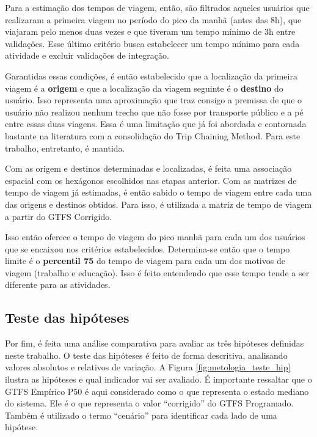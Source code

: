 \documentclass[        
    a4paper,          %
    12pt,             %
    chapter=TITLE,    %
    section=Title,    %
    subsection=Title, %
    oneside,          %
    english,          %
    spanish,          %
    brazil,           %
    fleqn             %
]{abntex2}
\begin{document}
  Para a estimação dos tempos de viagem, então, são filtrados aqueles usuários que realizaram a primeira viagem no período do pico da manhã (antes das 8h), que viajaram pelo menos duas vezes e que tiveram um tempo mínimo de 3h entre validações. Esse último critério busca estabelecer um tempo mínimo para cada atividade e excluir validações de integração.
  
  Garantidas essas condições, é então estabelecido que a localização da primeira viagem é a \textbf{origem} e que a localização da viagem seguinte é o \textbf{destino} do usuário. Isso representa uma aproximação que traz consigo a premissa de que o usuário não realizou nenhum trecho que não fosse por transporte público e a pé entre essas duas viagens. Essa é uma limitação que já foi abordada e contornada bastante na literatura \citep{Trepanier2007, Munizaga2012} com a consolidação do Trip Chaining Method. Para este trabalho, entretanto, é mantida.
  
  Com as origem e destinos determinadas e localizadas, é feita uma associação espacial com os hexágonos escolhidos nas etapas anterior. Com as matrizes de tempo de viagem já estimadas, é então sabido o tempo de viagem entre cada uma das origens e destinos obtidos. Para isso, é utilizada a matriz de tempo de viagem a partir do GTFS Corrigido.
  
  Isso então oferece o tempo de viagem do pico manhã para cada um dos usuários que se encaixou nos critérios estabelecidos. Determina-se então que o tempo limite é o \textbf{percentil 75} do tempo de viagem para cada um dos motivos de viagem (trabalho e educação). Isso é feito entendendo que esse tempo tende a ser diferente para as atividades.
  
  \hypertarget{teste-das-hipoteses}{%
  \subsection{Teste das hipóteses}\label{teste-das-hipoteses}}
  
  Por fim, é feita uma análise comparativa para avaliar as três hipóteses definidas neste trabalho. O teste das hipóteses é feito de forma descritiva, analisando valores absolutos e relativos de variação. A Figura \ref{fig:metologia_teste_hip} ilustra as hipóteses e qual indicador vai ser avaliado. É importante ressaltar que o GTFS Empírico P50 é aqui considerado como o que representa o estado mediano do sistema. Ele é o que representa o valor ``corrigido'' do GTFS Programado. Também é utilizado o termo ``cenário'' para identificar cada lado de uma hipótese.
  
\end{document}
